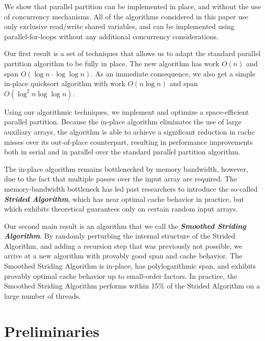 \documentclass[sigplan, 10pt, nonacm]{acmart}
\newcommand{\defn}[1]{{\textit{\textbf{\boldmath #1}}}}
\renewcommand{\paragraph}[1]{\vspace{0.09in}\noindent{\bf \boldmath #1.}}
\theoremstyle{remark}
\theoremstyle{remark}
\begin{document}
\paragraph{Results}
We show that parallel partition can be implemented in place, and
without the use of concurrency mechanisms. All of the algorithms
considered in this paper use only exclusive read/write shared
variables, and can be implemented using parallel-for-loops without any
additional concurrency considerations. 

Our first result is a set of techniques that allows us to adapt the
standard parallel partition algorithm to be fully in place. The new
algorithm has work $O(n)$ and span $O(\log n \cdot \log \log
n)$. As an immediate consequence, we also get a
simple in-place quicksort algorithm with work $O(n \log n)$ and span
$O(\log^2 n \log \log n)$.

Using our algorithmic techniques, we implement and optimize a
space-efficient parallel partition. Because the in-place algorithm
eliminates the use of large auxiliary arrays, the algorithm is able to
achieve a significant reduction in cache misses over its out-of-place
counterpart, resulting in performance improvements both in serial and
in parallel over the standard parallel partition algorithm.

The in-place algorithm remains bottlenecked by memory bandwidth,
however, due to the fact that multiple passes over the input array are
required. The memory-bandwidth bottleneck has led past researchers
\cite{FrancisPa92, Frias08} to introduce the so-called \defn{Strided
  Algorithm}, which has near optimal cache behavior in practice, but
which exhibits theoretical guarantees only on certain random input
arrays.

Our second main result is an algorithm that we call the \defn{Smoothed
  Striding Algorithm}. By randomly perturbing the internal structure
of the Strided Algorithm, and adding a recursion step that was
previously not possible, we arrive at a new algorithm with provably
good span and cache behavior. The Smoothed Striding Algorithm is
in-place, has polylogarithmic span, and exhibits provably optimal
cache behavior up to small-order factors. In practice, the Smoothed
Striding Algorithm performs within 15\% of the Strided Algorithm on a
large number of threads.



\section{Preliminaries}\label{secprelim}
\end{document}
